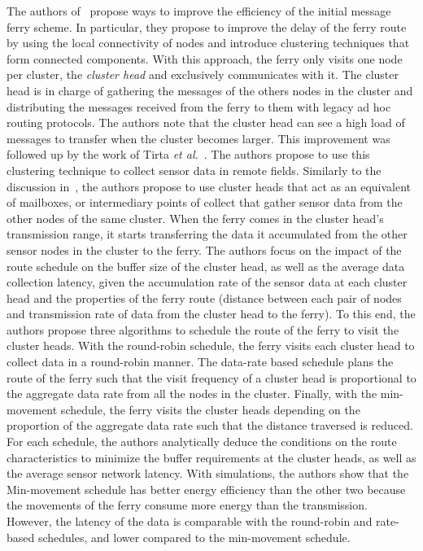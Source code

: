 The authors of~\cite{zhao2003message} propose ways to improve the efficiency of the initial message ferry scheme. In particular, they propose to improve the delay of the ferry route by using the local connectivity of nodes and introduce clustering techniques that form connected components. With this approach, the ferry only visits one node per cluster, the \textit{cluster head} and exclusively communicates with it. The cluster head is in charge of gathering the messages of the others nodes in the cluster and distributing the messages received from the ferry to them with legacy ad hoc routing protocols. The authors note that the cluster head can see a high load of messages to transfer when the cluster becomes larger. This improvement was followed up by the work of Tirta \textit{et al.}~\cite{tirta2004efficient}. The authors propose to use this clustering technique to collect sensor data in remote fields. Similarly to the discussion in~\cite{zhao2003message}, the authors propose to use cluster heads that act as an equivalent of mailboxes, or intermediary points of collect that gather sensor data from the other nodes of the same cluster. When the ferry comes in the cluster head's transmission range, it starts transferring the data it accumulated from the other sensor nodes in the cluster to the ferry. The authors focus on the impact of the route schedule on the buffer size of the cluster head, as well as the average data collection latency, given the accumulation rate of the sensor data at each cluster head and the properties of the ferry route (distance between each pair of nodes and transmission rate of data from the cluster head to the ferry). To this end, the authors propose three algorithms to schedule the route of the ferry to visit the cluster heads. With the round-robin schedule, the ferry visits each cluster head to collect data in a round-robin manner. The data-rate based schedule plans the route of the ferry such that the visit frequency of a cluster head is proportional to the aggregate data rate from all the nodes in the cluster. Finally, with the min-movement schedule, the ferry visits the cluster heads depending on the proportion of the aggregate data rate such that the distance traversed is reduced. For each schedule, the authors analytically deduce the conditions on the route characteristics to minimize the buffer requirements at the cluster heads, as well as the average sensor network latency. With simulations, the authors show that the Min-movement schedule has better energy efficiency than the other two because the movements of the ferry consume more energy than the transmission. However, the latency of the data is comparable with the round-robin and rate-based schedules, and lower compared to the min-movement schedule. 

